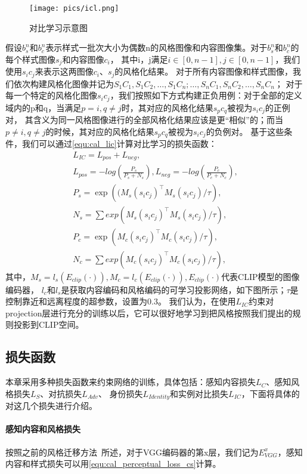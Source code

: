 \begin{figure}[htbp]
    \centering
    \texttt{[image: pics/icl.png]}
    \caption{\label{fig:pic_icl}对比学习示意图}
\end{figure}
假设$b_s^n$和$b_c^n$表示样式一批次大小为偶数n的风格图像和内容图像集。对于$b_s^n$和$b_c^n$的每个样式图像$s_j$和内容图像$c_i$，
其中i，j满足\(i\in[0,n-1],j\in[0,n-1]\)，我们使用$s_ic_j$来表示这两图像$c_i$、$s_j$的风格化结果。
对于所有内容图像和样式图像，我们依次构建风格化图像并记为\(S_1C_1,S_1C_2,\ldots,S_1C_n;\ldots,S_nC_1,S_nC_2,\ldots,S_nC_n\)；
对于每一个特定的风格化图像$s_i c_j$，我们按照如下方式构建正负用例：对于全部的定义域内的p和q，当满足$p= i,q\neq j$时，其对应的风格化结果$s_p c_q$被视为$s_i c_j$的正例对，
其含义为同一风格图像进行的全部风格化结果应该是更“相似”的；而当$p\neq i,q\neq j$的时候，其对应的风格化结果$s_p c_q$被视为$s_i c_j$的负例对。
基于这些条件，我们可以通过\autoref{equ:cal_lic}计算对比学习的损失函数：
\begin{equation}
    \label{equ:cal_lic}
    \begin{gathered}
        L_{IC}=L_{pos}+L_{neg}, \\
        L_{pos} =-log(\frac{P_s}{P_s+N_s}),L_{neg}=-log(\frac{P_c}{P_c+N_c}), \\
        P_s=\exp\left((M_s(s_ic_j)^\top M_s(s_ic_j)/\tau\right), \\
        N_s=\sum exp(M_s(s_ic_j)^\top M_s(s_ic_j)/\tau), \\
        P_c=\exp{(M_c(s_ic_j)^\top M_c(s_ic_j)/\tau)}, \\
        N_c=\sum exp(M_c(s_ic_j)^\top M_c(s_ic_j)/\tau), 
        \end{gathered}
\end{equation}
其中，\(M_s=l_s(E_{clip}(\cdot)),M_c=l_c(E_{clip}(\cdot)),E_{clip}(\cdot)\)代表CLIP模型的图像编码器，
$l_c$和$l_s$是获取内容编码和风格编码的可学习投影网络，如下图所示；$\tau$是控制靠近和远离程度的超参数，设置为0.3。
我们认为，在使用$L_{IC}$约束对projection层进行充分的训练以后，它可以很好地学习到把风格按照我们提出的规则投影到CLIP空间。

\subsection{损失函数}
本章采用多种损失函数来约束网络的训练，具体包括：感知内容损失$L_C$、感知风格损失$L_S$、对抗损失$L_{Adv}$、
身份损失$L_{Identity}$和实例对比损失$L_{IC}$，下面将具体的对这几个损失进行介绍。
\paragraph{感知内容和风格损失}
\par 按照之前的风格迁移方法~\cite{han2021dual}所述，对于VGG编码器的第x层，我们记为$E_{VGG}^x$，感知内容和样式损失可以用\autoref{equ:cal_perceptual_loss_cs}计算。

